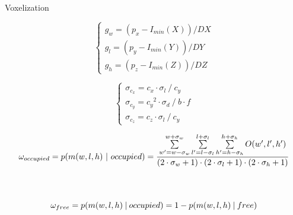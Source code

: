 \begin{frame}[t]{Voxelization}
\begin{overlayarea}{\textwidth}{\textheight}
\begin{itemize}
  \end{itemize}
   {
    \vskip-4.5cm
    \begin{block}{}
      \begin{equation}
	\nonumber
	\begin{cases}
	g_w = (p_x - I_{min}(X)) / DX\\
	g_l = (p_y - I_{min}(Y)) / DY\\
	g_h = (p_z - I_{min}(Z)) / DZ
	\end{cases}
      \end{equation}
    \end{block}
  }
   {
    \vskip-2.5cm
    \begin{block}{}
      \begin{equation}
	\nonumber
	\begin{cases}
	  \sigma_{c_x}={{{c_x} \cdot \sigma_l} ~/~ {c_y}} \\
	  \sigma_{c_y}={{{c_y}^2 \cdot \sigma_d} ~/~ {b \cdot f}} \\
	  \sigma_{c_z}={{{c_z} \cdot \sigma_l} ~/~ {c_y}}
	\end{cases}
      \end{equation}
    \end{block}
  }
   {
    \vskip-2.0cm
    \begin{block}{}
     \tiny
      \begin{equation}
	\nonumber
	\omega_{occupied} = p(m(w,l,h)~|~occupied) = {
	{\sum \limits_{w'=w-\sigma_w}^{w+\sigma_w} \sum \limits_{l'=l-\sigma_l}^{l+\sigma_l} \sum \limits_{h'=h-\sigma_h}^{h+\sigma_h} O(w',l',h')} 
	\over 
	{(2 \cdot \sigma_w + 1) \cdot (2 \cdot \sigma_l + 1) \cdot (2 \cdot \sigma_h + 1)}}
      \end{equation}
      \\~\\
      \begin{equation}
	\nonumber \tiny
	\omega_{free} = p(m(w,l,h)~|~occupied) = 1 - p(m(w,l,h)~|~free)
      \end{equation}
    \end{block}
  }
  \end{overlayarea}
  \note{
  }
\end{frame}

